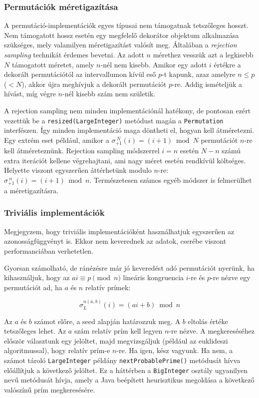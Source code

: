 \documentclass[
    parspace,
    noindent,
    nohyp,
]{elteiktdk}[2023/04/10]
\begin{document}
\subsubsection{Permutációk méretigazítása}

A permutáció-implementációk egyes típusai nem támogatnak tetszőleges hosszt.
Nem támogatott hossz esetén egy megfelelő dekorátor objektum alkalmazása szükséges,
mely valamilyen méretigazítást valósít meg.
Általában a \textit{rejection sampling} technikát érdemes bevetni.
Az adott $n$ mérethez vesszük azt a legkisebb $N$ támogatott méretet, amely $n$-nél nem kisebb.
Amikor egy adott $i$ értékre a dekorált permutációtól az intervallumon kívül eső $p$-t kapunk,
azaz amelyre $n \leq p$ ($< N$), akkor újra meghívjuk a dekorált permutációt $p$-re.
Addig ismételjük a hívást, míg végre $n$-nél kisebb szám nem születik.

A rejection sampling nem minden implementációnál hatékony,
de pontosan ezért vezettük be a \texttt{resized(LargeInteger)} metódust
magán a \texttt{Permutation} interfészen.
Így minden implementáció maga döntheti el, hogyan kell átméretezni.
Egy extrém eset például, amikor a $\sigma_{+1}^{~N}(i) = (i + 1) \bmod N$ permutációt $n$-re kell átméreteznünk.
Rejection sampling módszerrel $i = n$ esetén $N - n$ számú extra iterációt kellene végrehajtani,
ami nagy méret esetén rendkívül költséges.
Helyette viszont egyszerűen áttérhetünk modulo $n$-re: $\sigma_{+1}^{~n}(i) = (i + 1) \bmod n$.
Természetesen számos egyéb módszer is felmerülhet a méretigazításra.

\subsubsection{Triviális implementációk}

Megjegyzem, hogy triviális implementációként használhatjuk egyszerűen az azonosságfüggvényt is.
Ekkor nem keverednek az adatok, cserébe viszont performanciában verhetetlen.

Gyorsan számolható, de ránézésre már jó keveredést adó permutációt nyerünk, ha kihasználjuk, hogy az $ai \equiv p \pmod{n}$ lineáris kongruencia
$i$-re és $p$-re nézve egy permutációt ad, ha $a$ és $n$ relatív prímek:

$$
\sigma_L^{n(a,b)}(i) = (ai + b) \bmod n
$$

Az $a$ és $b$ számot előre, a seed alapján határozzuk meg.
A $b$ eltolás értéke tetszőleges lehet.
Az $a$ szám relatív prím kell legyen $n$-re nézve.
A megkereséséhez először választunk egy jelöltet,
majd megvizsgáljuk (például az euklideszi algoritmussal), hogy relatív prím-e $n$-re.
Ha igen, kész vagyunk.
Ha nem, a számot tároló \texttt{LargeInteger} példány
\texttt{nextProbablePrime()} metódusát hívva előállítjuk a következő jelöltet.
Ez a háttérben a \texttt{BigInteger} osztály ugyanilyen nevű metódusát hívja, amely a Java beépített heurisztikus megoldása a következő valószínű prím megkeresésére.
\end{document}
